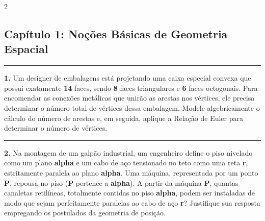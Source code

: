 \documentclass[twoside, 10pt, a4paper]{article}
\begin{document}
\raggedcolumns
\begin{multicols*}{2}
\vspace{0.1cm}

\subsection*{Capítulo 1: Noções Básicas de Geometria Espacial}
\vspace{-0.2cm}\noindent\rule{\linewidth}{1.5pt} 
\par\vspace{0.1cm}
\textbf{1.} Um designer de embalagens está projetando uma caixa especial convexa que possui exatamente \textbf{14} faces, sendo \textbf{8} faces triangulares e \textbf{6} faces octogonais. Para encomendar as conexões metálicas que unirão as arestas nos vértices, ele precisa determinar o número total de vértices dessa embalagem. Modele algebricamente o cálculo do número de arestas e, em seguida, aplique a Relação de Euler para determinar o número de vértices.
\par\vspace{0.5cm}
\noindent\textcolor{CorLinha}{\rule{\linewidth}{0.5pt}} 
\par\vspace{0.1cm}
\textbf{2.} Na montagem de um galpão industrial, um engenheiro define o piso nivelado como um plano \textbf{alpha} e um cabo de aço tensionado no teto como uma reta \textbf{r}, estritamente paralela ao plano \textbf{alpha}. Uma máquina, representada por um ponto \textbf{P}, repousa no piso (\textbf{P} pertence a \textbf{alpha}). A partir da máquina \textbf{P}, quantas canaletas retilíneas, totalmente contidas no piso \textbf{alpha}, podem ser instaladas de modo que sejam perfeitamente paralelas ao cabo de aço \textbf{r}? Justifique sua resposta empregando os postulados da geometria de posição.


\end{multicols*}
\end{document}
